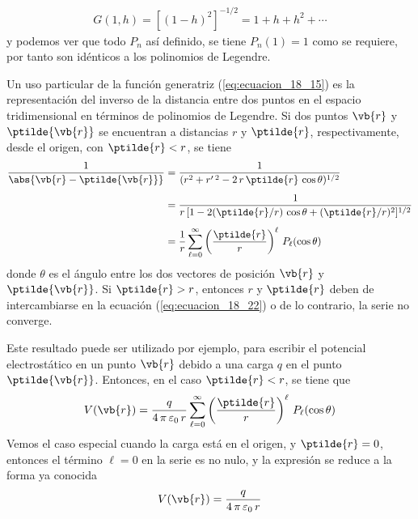 \begin{align*}
G(1, h) = [(1 - h)^{2}]^{-1/2} =  1 + h + h^{2} + \cdots
\end{align*}
y podemos ver que todo $P_{n}$ así definido, se tiene $P_{n} (1) = 1$ como se requiere, por tanto son idénticos a los polinomios de Legendre.
\par
Un uso particular de la función generatriz (\ref{eq:ecuacion_18_15}) es la representación del inverso de la distancia entre dos puntos en el espacio tridimensional en términos de polinomios de Legendre. Si dos puntos $\vb{r}$ y $\ptilde{\vb{r}}$ se encuentran a distancias $r$ y $\ptilde{r}$, respectivamente, desde el origen, con $\ptilde{r} < r$, se tiene
\begin{align}
\begin{aligned}[b]
\dfrac{1}{\abs{\vb{r} - \ptilde{\vb{r}}}} &= \dfrac{1}{(r^{2} + r^{\prime \: 2} - 2 \, r \, \ptilde{r} \, \cos \theta)^{1/2}} \\[0.5em]
&= \dfrac{1}{r \, [ 1 -2 (\ptilde{r}/r) \, \cos \theta + (\ptilde{r}/r)^{2}]^{1/2}} \\[0.5em]
&= \dfrac{1}{r} \sum_{\ell = 0}^{\infty} \left( \dfrac{\ptilde{r}}{r} \right)^{\ell} \, P_{\ell} (\cos \theta)
\end{aligned}
\label{eq:ecuacion_18_22}
\end{align}
donde $\theta$ es el ángulo entre los dos vectores de posición $\vb{r}$ y $\ptilde{\vb{r}}$. Si $\ptilde{r} > r$, entonces $r$ y $\ptilde{r}$ deben de intercambiarse en la ecuación (\ref{eq:ecuacion_18_22}) o de lo contrario, la serie no converge.
\par
Este resultado puede ser utilizado por ejemplo, para escribir el potencial electrostático en un punto $\vb{r}$ debido a una carga $q$ en el punto $\ptilde{\vb{r}}$. Entonces, en el caso $\ptilde{r} < r$, se tiene que
\begin{align*}
V(\vb{r}) = \dfrac{q}{4 \, \pi \, \varepsilon_{0} \, r} \sum_{\ell=0}^{\infty} \left( \dfrac{\ptilde{r}}{r} \right)^{\ell} \, P_{\ell} (\cos \theta)
\end{align*}
Vemos el caso especial cuando la carga está en el origen, y $\ptilde{r} = 0$, entonces el término $\ell =0$ en la serie es no nulo, y la expresión se reduce a la forma ya conocida 
\begin{align*}
V(\vb{r}) = \dfrac{q}{4 \, \pi \, \varepsilon_{0} \, r}
\end{align*}
